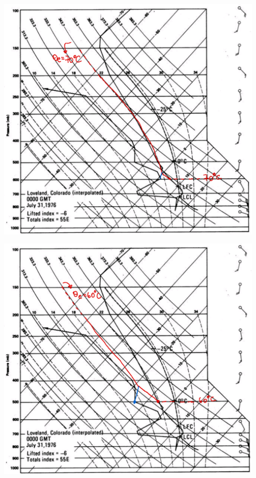 \documentclass[../main.tex]{subfiles}
\begin{document}
\begin{enumerate}[a)]
\begin{minipage}{0.5\linewidth}
    \centering
      \includegraphics[width=\textwidth]{img/oe3}
\end{minipage}
\begin{minipage}{0.5\linewidth}
    \centering
      \includegraphics[width=\textwidth]{img/oe4}
\end{minipage}\\


\end{enumerate}
\end{document}
